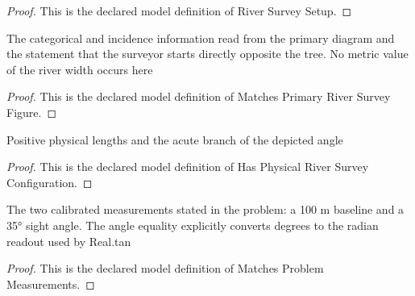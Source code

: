 \begin{proof}
  This is the declared model definition of River Survey Setup.
\end{proof}
\begin{definition}
  \label{def:physics:phyx-mini-0676:phyxminiproblems-problemphyxmini0676-matchesprimaryriversurveyfigure}
  The categorical and incidence information read from the primary diagram and the statement that the surveyor starts directly opposite the tree. No metric value of the river width occurs here
\end{definition}
\begin{proof}
  This is the declared model definition of Matches Primary River Survey Figure.
\end{proof}
\begin{definition}
  \label{def:physics:phyx-mini-0676:phyxminiproblems-problemphyxmini0676-hasphysicalriversurveyconfiguration}
  Positive physical lengths and the acute branch of the depicted angle
\end{definition}
\begin{proof}
  This is the declared model definition of Has Physical River Survey Configuration.
\end{proof}
\begin{definition}
  \label{def:physics:phyx-mini-0676:phyxminiproblems-problemphyxmini0676-matchesproblemmeasurements}
  The two calibrated measurements stated in the problem: a 100 m baseline and a 35° sight angle. The angle equality explicitly converts degrees to the radian readout used by Real.tan
\end{definition}
\begin{proof}
  This is the declared model definition of Matches Problem Measurements.
\end{proof}
